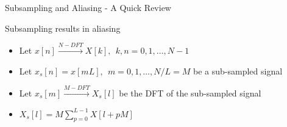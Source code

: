 	\begin{frame}{Subsampling and Aliasing - A Quick Review}
\begin{block}{Subsampling results in aliasing}
\begin{itemize}
  \item Let $x[n] \xrightarrow{N-DFT} X[k] , \ \ k,n = 0,1, \ldots,N-1$
  \item Let $x_{s}[n]  = x[mL] , \ \ m = 0,1, \ldots, N/L=M$ be a sub-sampled signal
  \item Let $x_s[m] \xrightarrow{M-DFT} X_s[l]$ be the DFT of the sub-sampled signal
  \item $\boxed{X_s[l] = M\sum\limits_{p=0}^{L-1}X[l+pM]}$
\end{itemize}
\end{block}
%		
%			
%			
	\end{frame}
